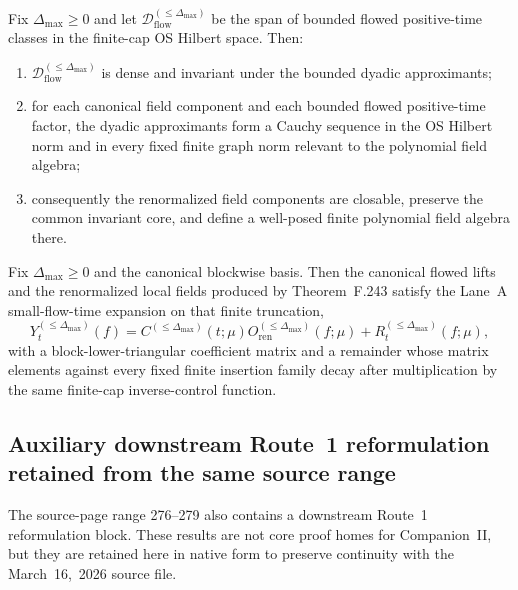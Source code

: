 \begin{lemma}
Fix $\Delta_{\max}\ge 0$ and let $\mathcal D_{\mathrm{flow}}^{(\le \Delta_{\max})}$ be the span of bounded flowed positive-time classes in the finite-cap OS Hilbert space. Then:
\begin{enumerate}[label=(\roman*),leftmargin=2.2em]
\item $\mathcal D_{\mathrm{flow}}^{(\le \Delta_{\max})}$ is dense and invariant under the bounded dyadic approximants;
\item for each canonical field component and each bounded flowed positive-time factor, the dyadic approximants form a Cauchy sequence in the OS Hilbert norm and in every fixed finite graph norm relevant to the polynomial field algebra;
\item consequently the renormalized field components are closable, preserve the common invariant core, and define a well-posed finite polynomial field algebra there.
\end{enumerate}
\end{lemma}

\begin{corollary}
Fix $\Delta_{\max}\ge 0$ and the canonical blockwise basis. Then the canonical flowed lifts and the renormalized local fields produced by Theorem~F.243 satisfy the Lane~A small-flow-time expansion on that finite truncation,
\[
Y_t^{(\le \Delta_{\max})}(f)
=
C^{(\le \Delta_{\max})}(t;\mu)
O_{\mathrm{ren}}^{(\le \Delta_{\max})}(f;\mu)
+
R_t^{(\le \Delta_{\max})}(f;\mu),
\]
with a block-lower-triangular coefficient matrix and a remainder whose matrix elements against every fixed finite insertion family decay after multiplication by the same finite-cap inverse-control function.
\end{corollary}


\subsection{Auxiliary downstream Route~1 reformulation retained from the same source range}
The source-page range 276--279 also contains a downstream Route~1 reformulation block. These results are not core proof homes for Companion~II, but they are retained here in native form to preserve continuity with the March~16,~2026 source file.

